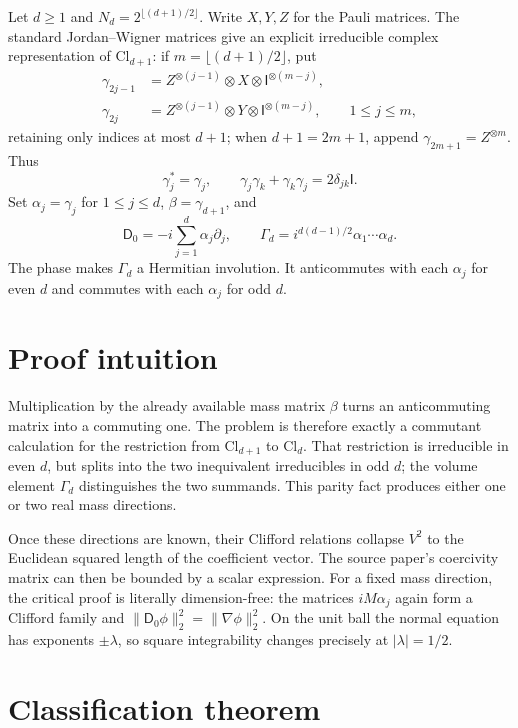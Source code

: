 \documentclass[11pt]{article}
\newcommand{\Id}{\mathsf I}
\newcommand{\Dzero}{\mathsf D_0}
\begin{document}
Let $d\geq1$ and $N_d=2^{\lfloor(d+1)/2\rfloor}$.  Write $X,Y,Z$ for the
Pauli matrices.  The standard Jordan--Wigner matrices give an explicit
irreducible complex representation of $\mathrm{Cl}_{d+1}$: if
$m=\lfloor(d+1)/2\rfloor$, put
\begin{align*}
 \gamma_{2j-1}&=Z^{\otimes(j-1)}\otimes X\otimes
                  \Id^{\otimes(m-j)},\\
 \gamma_{2j}&=Z^{\otimes(j-1)}\otimes Y\otimes
                  \Id^{\otimes(m-j)},\qquad 1\leq j\leq m,
\end{align*}
retaining only indices at most $d+1$; when $d+1=2m+1$, append
$\gamma_{2m+1}=Z^{\otimes m}$.  Thus
\[
 \gamma_j^*=\gamma_j,
 \qquad \gamma_j\gamma_k+\gamma_k\gamma_j=2\delta_{jk}\Id.
\]
Set $\alpha_j=\gamma_j$ for $1\leq j\leq d$, $\beta=\gamma_{d+1}$, and
\[
 \Dzero=-i\sum_{j=1}^d\alpha_j\partial_j,
 \qquad
 \Gamma_d=i^{d(d-1)/2}\alpha_1\cdots\alpha_d.
\]
The phase makes $\Gamma_d$ a Hermitian involution.  It anticommutes with each
$\alpha_j$ for even $d$ and commutes with each $\alpha_j$ for odd $d$.

\section{Proof intuition}

Multiplication by the already available mass matrix $\beta$ turns an
anticommuting matrix into a commuting one.  The problem is therefore exactly a
commutant calculation for the restriction from $\mathrm{Cl}_{d+1}$ to
$\mathrm{Cl}_d$.  That restriction is irreducible in even $d$, but splits into
the two inequivalent irreducibles in odd $d$; the volume element $\Gamma_d$
distinguishes the two summands.  This parity fact produces either one or two
real mass directions.

Once these directions are known, their Clifford relations collapse $V^2$ to
the Euclidean squared length of the coefficient vector.  The source paper's
coercivity matrix can then be bounded by a scalar expression.  For a fixed
mass direction, the critical proof is literally dimension-free: the matrices
$iM\alpha_j$ again form a Clifford family and
$\|\Dzero\phi\|_2^2=\|\nabla\phi\|_2^2$.  On the unit ball the normal equation
has exponents $\pm\lambda$, so square integrability changes precisely at
$|\lambda|=1/2$.

\section{Classification theorem}
\end{document}
